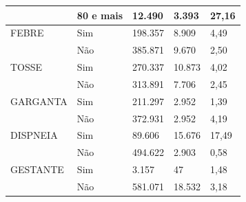 \begin{longtable}{lllll}
                                                               & 80 e mais     & 12.490  & 3.393         & 27,16          \\ \hline
FEBRE                                                          & Sim  & 198.357 & 8.909  & 4,49 \\
                                                               & Não           & 385.871 & 9.670         & 2,50           \\ \hline
TOSSE                                                          & Sim   & 270.337 & 10.873         & 4,02           \\
                                                               & Não           & 313.891 & 7.706         & 2,45           \\ \hline
GARGANTA                                                       & Sim  & 211.297 &  2.952  & 1,39           \\
                                                               & Não & 372.931 & 2.952        & 4,19           \\ \hline
DISPNEIA                                                       & Sim           & 89.606 & 15.676        & 17,49          \\
                                                               & Não           & 494.622 & 2.903         & 0,58           \\ \hline
GESTANTE                                                       & Sim           & 3.157   & 47           & 1,48           \\
                                                               & Não           & 581.071 & 18.532        & 3,18           \\ \hline
                                                               

\end{longtable}
